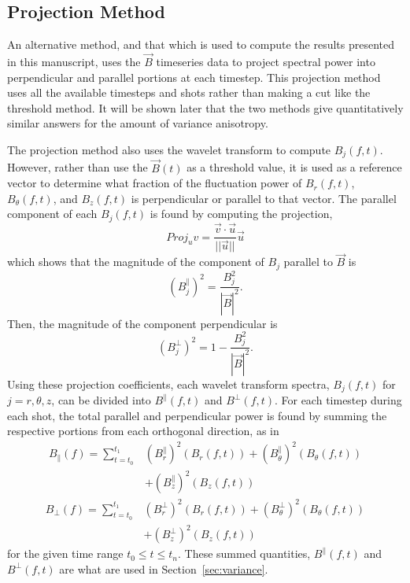 \documentclass[aip,prl,amsmath,amssymb,reprint,superscriptaddress]{revtex4-1} %
\begin{document}
\subsection{Projection Method}\label{sec:projection2}

An alternative method, and that which is used to compute the results presented in this manuscript, uses the $\vec{B}$ timeseries data to project spectral power into perpendicular and parallel portions at each timestep. This projection method uses all the available timesteps and shots rather than making a cut like the threshold method. It will be shown later that the two methods give quantitatively similar answers for the amount of variance anisotropy.

The projection method also uses the wavelet transform to compute $B_{j}(f,t)$. However, rather than use the $\vec{B}(t)$ as a threshold value, it is used as a reference vector to determine what fraction of the fluctuation power of $B_{r}(f,t)$, $B_{\theta}(f,t)$, and $B_{z}(f,t)$ is perpendicular or parallel to that vector. The parallel component of each $B_{j}(f,t)$ is found by computing the projection,
\begin{equation}
Proj_{u}v = \frac{\vec{v} \cdot \vec{u}}{||\vec{u}||}\vec{u}
\label{eq:projection}
\end{equation}
which shows that the magnitude of the component of $B_{j}$ parallel to $\vec{B}$ is
\begin{equation}
(B_{j}^{\parallel})^{2} = \frac{B^{2}_{j}}{|\vec{B}|^{2}}.
\label{eq:para_mag}
\end{equation}
Then, the magnitude of the component perpendicular is
\begin{equation}
(B_{j}^{\perp})^2 = 1 - \frac{B^{2}_{j}}{|\vec{B}|^{2}}.
\label{eq:perp_mag}
\end{equation}
Using these projection coefficients, each wavelet transform spectra, $B_{j}(f,t)$ for $j = r,\theta,z$, can be divided into $B^{\parallel}(f,t)$ and $B^{\perp}(f,t)$. For each timestep during each shot, the total parallel and perpendicular power is found by summing the respective portions from each orthogonal direction, as in
\begin{equation}
\begin{split}
B_{\parallel}(f) = \sum_{t=t_{0}}^{t_{1}} &(B_{r}^{\parallel})^{2}(B_{r}(f,t))+(B_{\theta}^{\parallel})^{2}(B_{\theta}(f,t))\\
																					&+(B_{z}^{\parallel})^{2}(B_{z}(f,t))
\label{eq:Bparallel}
\end{split}
\end{equation}
\begin{equation}
\begin{split}
B_{\perp}(f) = \sum_{t=t_{0}}^{t_{1}} &(B_{r}^{\perp})^{2}(B_{r}(f,t))+(B_{\theta}^{\perp})^{2}(B_{\theta}(f,t))\\
																					&+(B_{z}^{\perp})^{2}(B_{z}(f,t))
\label{eq:Bperp}
\end{split}
\end{equation}
for the given time range $t_{0}\leq t \leq t_{n}$. These summed quantities, $B^{\parallel}(f,t)$ and $B^{\perp}(f,t)$ are what are used in Section~\ref{sec:variance}.
\end{document}
